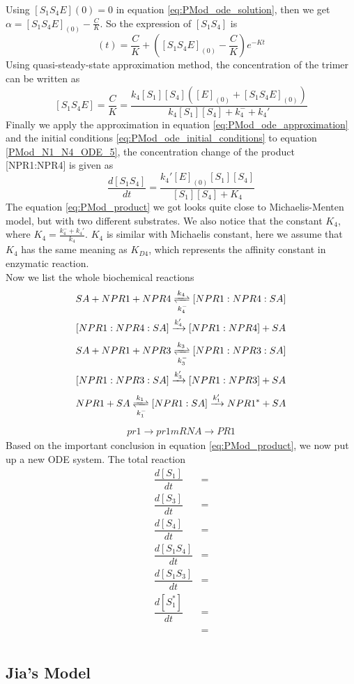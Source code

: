 Using $[S_1 S_4 E](0) = 0$ in equation \ref{eq:PMod_ode_solution}, then we get $\alpha = [S_1 S_4 E]_{(0)} - \frac{C}{K}$. So the expression of $[S_1 S_4]$ is 
\begin{equation}
[S_1 S_4 E](t) = \dfrac{C}{K} + ([S_1 S_4 E]_{(0)}-\dfrac{C}{K})e^{-Kt}
\end{equation}
Using quasi-steady-state approximation method, the concentration of the trimer can be written as
\begin{equation} \label{eq:PMod_ode_approximation}
[S_1 S_4 E] = \dfrac{C}{K} = \dfrac{k_4[S_1][S_4]([E]_{(0)}+[S_1 S_4 E]_{(0)})}{k_4[S_1][S_4]+k_4^{-}+k_4'}
\end{equation}
Finally we apply the approximation in equation \ref{eq:PMod_ode_approximation} and the initial conditions \ref{eq:PMod_ode_initial_conditions} to equation \ref{PMod_N1_N4_ODE_5}, the concentration change of the product [NPR1:NPR4] is given as
\begin{equation} \label{eq:PMod_product}
\dfrac{d[S_1 S_4]}{dt} = \dfrac{k_4'[E]_{(0)}[S_1][S_4]}{[S_1][S_4]+K_4}
\end{equation}
The equation \ref{eq:PMod_product} we got looks quite close to Michaelis-Menten model, but with two different substrates. We also notice that the constant $K_4$, where $K_4 = \frac{k_4^{-}+k_4'}{k_4}$. $K_4$ is similar with Michaelis constant, here we assume that $K_4$ has the same meaning as $K_{D4}$, which represents the affinity constant in enzymatic reaction.\\
Now we list the whole biochemical reactions \\
\begin{gather}
SA + NPR1 + NPR4 \xrightleftharpoons[k_4^{-}]{k_4} [NPR1:NPR4:SA] \\
[NPR1:NPR4:SA] \xrightarrow{k_4'} [NPR1:NPR4] + SA
\end{gather}
\begin{gather}
SA + NPR1 + NPR3 \xrightleftharpoons[k_3^{-}]{k_3} [NPR1:NPR3:SA] \\
[NPR1:NPR3:SA] \xrightarrow{k_3'} [NPR1:NPR3] + SA
\end{gather}
\begin{gather}
NPR1 + SA \xrightleftharpoons[k_1^{-}]{k_1} [NPR1:SA] \xrightarrow{k_1'} NPR1^{\ast} + SA
\end{gather}
\begin{gather}
pr1 \xrightarrow{} pr1 mRNA \xrightarrow{} PR1
\end{gather}
Based on the important conclusion in equation \ref{eq:PMod_product}, we now put up a new ODE system. The total reaction 
\begin{align}
\dfrac{d[S_1]}{dt} &=   \label{eq:PMod_S_1} \\ 
\dfrac{d[S_3]}{dt} &=  	\label{eq:PMod_S_3} \\
\dfrac{d[S_4]}{dt} &=   \label{eq:PMod_S_4} \\
\dfrac{d[S_1 S_4]}{dt} &=     \label{eq:PMod_S_1_S_4} \\
\dfrac{d[S_1 S_3]}{dt} &=	  \label{eq:PMod_S_1_S_3} \\
\dfrac{d[S_1^{\ast}]}{dt} &=      \label{eq:PMod_S_1*} \\
\dfrac{}{} &= 
\end{align}
\subsection{Jia's Model}